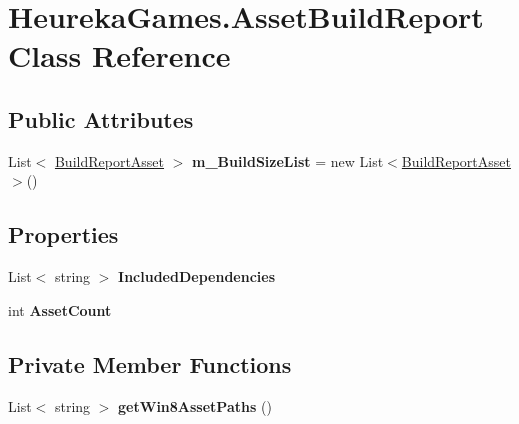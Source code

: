 \hypertarget{class_heureka_games_1_1_asset_build_report}{}\section{Heureka\+Games.\+Asset\+Build\+Report Class Reference}
\label{class_heureka_games_1_1_asset_build_report}
\subsection*{Public Attributes}
\begin{DoxyCompactItemize}
\item 
\mbox{\label{class_heureka_games_1_1_asset_build_report_a239e3f23868ab96af6ac637e5d409186}} 
List$<$ \hyperlink{class_heureka_games_1_1_build_report_asset}{Build\+Report\+Asset} $>$ {\bfseries m\+\_\+\+Build\+Size\+List} = new List$<$\hyperlink{class_heureka_games_1_1_build_report_asset}{Build\+Report\+Asset}$>$()
\end{DoxyCompactItemize}
\subsection*{Properties}
\begin{DoxyCompactItemize}
\item 
\mbox{\label{class_heureka_games_1_1_asset_build_report_a598c1ad459bbd856d850e23f5261bdab}} 
List$<$ string $>$ {\bfseries Included\+Dependencies}
\item 
\mbox{\label{class_heureka_games_1_1_asset_build_report_a832266c56eb8aaed78d4d022943020a1}} 
int {\bfseries Asset\+Count}
\end{DoxyCompactItemize}
\subsection*{Private Member Functions}
\begin{DoxyCompactItemize}
\item 
\mbox{\label{class_heureka_games_1_1_asset_build_report_a3faa5a9993211bc90b14d37df4f649ad}} 
List$<$ string $>$ {\bfseries get\+Win8\+Asset\+Paths} ()
\end{DoxyCompactItemize}
